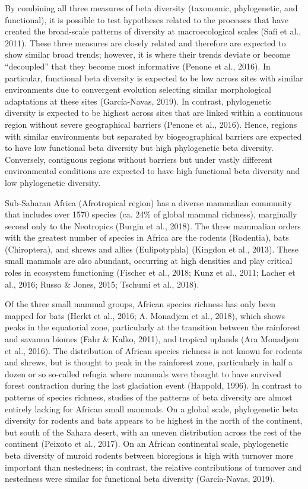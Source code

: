 \documentclass{article}
\begin{document}
By combining all three measures of beta diversity (taxonomic, phylogenetic, and functional), it is possible to test hypotheses related to the processes that have created the broad-scale patterns of diversity at macroecological scales (Safi et al., 2011). These three measures are closely related and therefore are expected to show similar broad trends; however, it is where their trends deviate or become “decoupled” that they become most informative (Penone et al., 2016). In particular, functional beta diversity is expected to be low across sites with similar environments due to convergent evolution selecting similar morphological adaptations at these sites (García-Navas, 2019). In contrast, phylogenetic diversity is expected to be highest across sites that are linked within a continuous region without severe geographical barriers (Penone et al., 2016). Hence, regions with similar environments but separated by biogeographical barriers are expected to have low functional beta diversity but high phylogenetic beta diversity. Conversely, contiguous regions without barriers but under vastly different environmental conditions are expected to have high functional beta diversity and low phylogenetic diversity. 

\vspace{5mm}

Sub-Saharan Africa (Afrotropical region) has a diverse mammalian community that includes over 1570 species (ca. 24\% of global mammal richness), marginally second only to the Neotropics (Burgin et al., 2018). The three mammalian orders with the greatest number of species in Africa are the rodents (Rodentia), bats (Chiroptera), and shrews and allies (Eulipotyphla) (Kingdon et al., 2013). These small mammals are also abundant, occurring at high densities and play critical roles in ecosystem functioning (Fischer et al., 2018; Kunz et al., 2011; Lacher et al., 2016; Russo \& Jones, 2015; Tschumi et al., 2018). 

\vspace{5mm}
Of the three small mammal groups, African species richness has only been mapped for bats (Herkt et al., 2016; A. Monadjem et al., 2018), which shows peaks in the equatorial zone, particularly at the transition between the rainforest and savanna biomes (Fahr \& Kalko, 2011), and tropical uplands (Ara Monadjem et al., 2016). The distribution of African species richness is not known for rodents and shrews, but is thought to peak in the rainforest zone, particularly in half a dozen or so so-called refugia where mammals were thought to have survived forest contraction during the last glaciation event (Happold, 1996). In contrast to patterns of species richness, studies of the patterns of beta diversity are almost entirely lacking for African small mammals. On a global scale, phylogenetic beta diversity for rodents and bats appears to be highest in the north of the continent, but south of the Sahara desert, with an uneven distribution across the rest of the continent (Peixoto et al., 2017). On an African continental scale, phylogenetic beta diversity of muroid rodents between bioregions is high with turnover more important than nestedness; in contrast, the relative contributions of turnover and nestedness were similar for functional beta diversity (García-Navas, 2019). 
\end{document}
